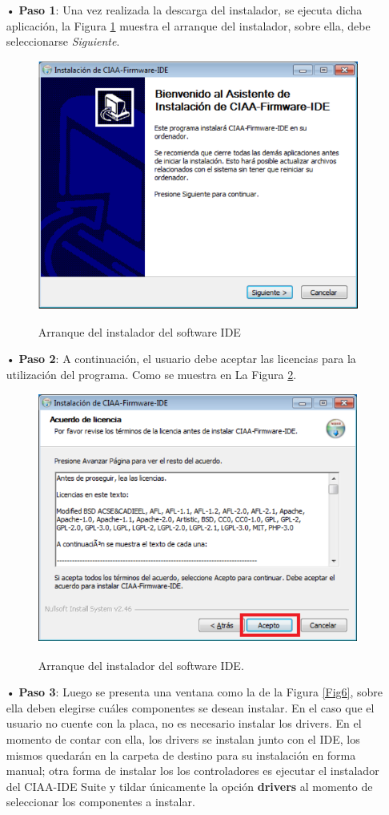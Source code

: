 \documentclass[12pt,letterpaper]{article}
\begin{document}
\begin{enumerate}
\item[•]\textbf{Paso 1}: Una vez realizada la descarga del instalador, se ejecuta dicha aplicación, la Figura \ref{Fig4} muestra el arranque del instalador, sobre ella, debe seleccionarse \textit{Siguiente}.
\begin{figure}[H]
\centering
\includegraphics[width=8 cm]{figuras/instalacion1.png}\\
\caption{Arranque del instalador del software IDE}
\label{Fig4}
\end{figure}
\item[•]\textbf{Paso 2}: A continuación, el usuario debe aceptar las licencias para la utilización del programa. Como se muestra en La Figura \ref{Fig5}.
\begin{figure}[H]
\centering
\includegraphics[width=8 cm]{figuras/instalacion2.png}\\
\caption{Arranque del instalador del software IDE.}
\label{Fig5}
\end{figure}
\item[•]\textbf{Paso 3}: Luego se presenta una ventana como la de la Figura \ref{Fig6}, sobre ella deben elegirse cuáles componentes se desean instalar. En el caso que el usuario no cuente con la placa, no es necesario instalar los drivers. En el momento de contar con ella, los drivers se instalan junto con el IDE, los mismos quedarán en la carpeta de destino para su instalación en forma manual; otra forma de instalar los  los controladores es ejecutar el instalador del CIAA-IDE Suite y tildar únicamente la opción \textbf{drivers} al momento de seleccionar los componentes a instalar. 

\end{enumerate}
\end{document}
